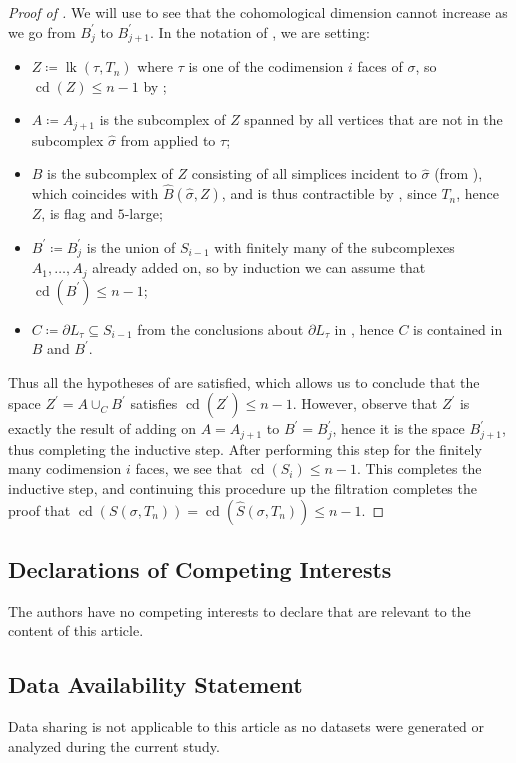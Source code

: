 \documentclass[12pt, letterpaper]{article}
\newcommand{\lk}{\operatorname{lk}}
\newcommand{\cdim}{\operatorname{cd}}
\newcommand{\cd}{\operatorname{cd}}
\theoremstyle{plain}
\theoremstyle{definition}
\begin{document}
\begin{proof}[Proof of ]
We will use  to see that the cohomological dimension cannot increase as we go from $B_j^\prime$ to $B_{j+1}^\prime$. In the notation of , we are setting:
    \begin{itemize}
        \item $Z\coloneqq\lk(\tau, T_n)$ where $\tau$ is one of the codimension $i$ faces of $\sigma$, so $\cdim(Z)\leq n-1$ by ;
        \item $A\coloneqq A_{j+1}$ is the subcomplex of $Z$ spanned by all vertices that are not in the subcomplex $\hat \sigma$ from  applied to $\tau$;
        \item $B$ is the subcomplex of $Z$ consisting of all simplices incident to $\hat \sigma$ (from ), which coincides with $\hat B(\hat \sigma, Z)$, and is thus contractible by , since $T_n$, hence $Z$, is flag and $5$-large;
        \item $B^\prime\coloneqq B_j^\prime$ is the union of $S_{i-1}$ with finitely many of the subcomplexes $A_1, \ldots , A_j$ already added on, so by induction we can assume that $\cdim(B^\prime) \leq n-1$;
        \item $C \coloneqq\partial L_\tau \subseteq S_{i-1}$ from the conclusions about $\partial L_\tau$ in , hence $C$ is contained in $B$ and $B^\prime$.
    \end{itemize}
Thus all the hypotheses of  are satisfied, which allows us to conclude that the space $Z^\prime=A\cup_C B^\prime$ satisfies $\cdim(Z^\prime)\leq n-1$. However, observe that $Z^\prime$ is exactly the result of adding on $A=A_{j+1}$ to $B^\prime=B_j^\prime$, hence it is the space $B_{j+1}^\prime$, thus completing the inductive step. After performing this step for the finitely many codimension $i$ faces, we see that $\cdim(S_i)\leq n-1$. This completes the inductive step, and continuing this procedure up the filtration completes the proof that $\cd(S(\sigma, T_n))=\cd(\hat S(\sigma, T_n)) \leq n-1$.
\end{proof}

\subsection*{Declarations of Competing Interests} The authors have no competing interests to declare that are relevant to the content of this article.  

\subsection*{Data Availability Statement} Data sharing is not applicable to this article as no datasets were generated or analyzed during the current study.



\end{document}
